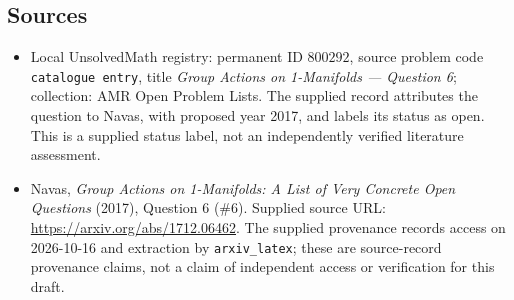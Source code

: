 \documentclass[11pt]{article}
\begin{document}
\subsection{Sources}
\begin{itemize}
\item Local UnsolvedMath registry: permanent ID \(800292\), source problem code \texttt{catalogue entry}, title \emph{Group Actions on 1-Manifolds --- Question 6}; collection: AMR Open Problem Lists. The supplied record attributes the question to Navas, with proposed year 2017, and labels its status as open. This is a supplied status label, not an independently verified literature assessment.
\item Navas, \emph{Group Actions on 1-Manifolds: A List of Very Concrete Open Questions} (2017), Question 6 (\#6). Supplied source URL: \url{https://arxiv.org/abs/1712.06462}. The supplied provenance records access on 2026-10-16 and extraction by \texttt{arxiv\_latex}; these are source-record provenance claims, not a claim of independent access or verification for this draft.
\end{itemize}
\end{document}
